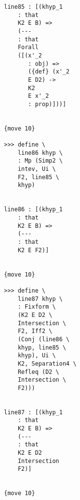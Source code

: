 \documentclass[12pt]{article}
\begin{document}
\begin{verbatim}
                                 line85 : [(khyp_1 
                                     : that 
                                     K2 E B) => 
                                     (--- 
                                     : that 
                                     Forall 
                                     ([(x'_2 
                                        : obj) => 
                                        ({def} (x'_2 
                                        E D2) -> 
                                        K2 
                                        E x'_2 
                                        : prop)]))]


                                 {move 10}

                                 >>> define \
                                     line86 khyp \
                                     : Mp (Simp2 \
                                     intev, Ui \
                                     F2, line85 \
                                     khyp)


                                 line86 : [(khyp_1 
                                     : that 
                                     K2 E B) => 
                                     (--- 
                                     : that 
                                     K2 E F2)]


                                 {move 10}

                                 >>> define \
                                     line87 khyp \
                                     : Fixform \
                                     (K2 E D2 \
                                     Intersection \
                                     F2, Iff2 \
                                     (Conj (line86 \
                                     khyp, line85 \
                                     khyp), Ui \
                                     K2, Separation4 \
                                     Refleq (D2 \
                                     Intersection \
                                     F2)))


                                 line87 : [(khyp_1 
                                     : that 
                                     K2 E B) => 
                                     (--- 
                                     : that 
                                     K2 E D2 
                                     Intersection 
                                     F2)]


                                 {move 10}


\end{verbatim}
\end{document}
